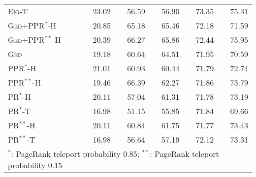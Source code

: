 \begin{tabular}{lrrrrr}
\textsc{Eig}-T                           &    23.02 &        56.59 &         56.90 &     73.35 &          75.31 \\
\textsc{Ged+PPR}$^*$-H                   &    20.85 &        65.18 &         65.46 &     72.18 &          71.59 \\
\textsc{Ged+PPR}$^{**}$-H                &    20.39 &        66.27 &         65.86 &     72.44 &          75.95 \\
\textsc{Ged}                             &    19.18 &        60.64 &         64.51 &     71.95 &          70.59 \\
\textsc{PPR}$^*$-H                       &    21.01 &        60.93 &         60.44 &     71.79 &          72.74 \\
\textsc{PPR}$^{**}$-H                    &    19.46 &        66.39 &         62.27 &     71.86 &          73.79 \\
\textsc{PR}$^*$-H                        &    20.11 &        57.04 &         61.31 &     71.78 &          73.19 \\
\textsc{PR}$^*$-T                      &    16.98 &        51.15 &         55.85 &     71.84 &          69.66 \\
\textsc{PR}$^{**}$-H                     &    20.11 &        60.84 &         61.75 &     71.77 &          73.43 \\
\textsc{PR}$^{**}$-T                   &    16.98 &        56.64 &         57.19 &     72.12 &          73.31 \\
\bottomrule
\multicolumn{6}{l}{$^*$: PageRank teleport probability 0.85; $^{**}$: PageRank teleport probability 0.15}
\end{tabular}
